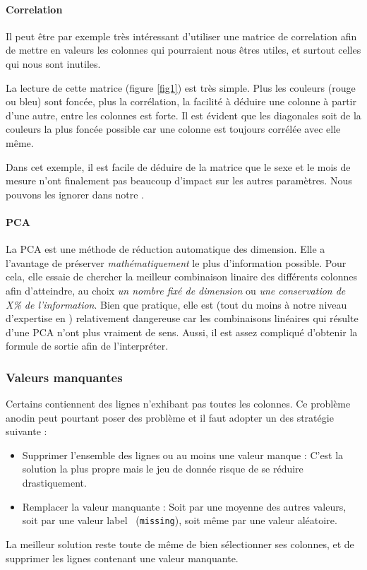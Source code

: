 \paragraph{Correlation}
Il peut être par exemple très intéressant d'utiliser une matrice de correlation afin de mettre en valeurs les colonnes qui pourraient nous êtres utiles, et surtout celles qui nous sont inutiles.

La lecture de cette matrice (figure \ref{fig1}) est très simple. Plus les couleurs (rouge ou bleu) sont foncée, plus la corrélation, \ie la facilité à déduire une colonne à partir d'une autre, entre les colonnes est forte. Il est évident que les diagonales soit de la couleurs la plus foncée possible car une colonne est toujours corrélée avec elle même.

Dans cet exemple, il est facile de déduire de la matrice que le sexe et le mois de mesure n'ont finalement pas beaucoup d'impact sur les autres paramètres. Nous pouvons les ignorer dans notre .

\paragraph{PCA}
La \gls{PCA} est une méthode de réduction automatique des dimension. Elle a l'avantage de préserver \textsl{mathématiquement} le plus d'information possible. Pour cela, elle essaie de chercher la meilleur combinaison linaire des différents colonnes afin d'atteindre, au choix \emph{un nombre fixé de dimension} ou \emph{une conservation de X\% de l'information}.
Bien que pratique, elle est (tout du moins à notre niveau d'expertise en ) relativement dangereuse car les combinaisons linéaires qui résulte d'une \gls{PCA} n'ont plus vraiment de sens. Aussi, il est assez compliqué d'obtenir la formule de sortie afin de l'interpréter.

\subsubsection{Valeurs manquantes}
Certains  contiennent des lignes n'exhibant pas toutes les colonnes. Ce problème anodin peut pourtant poser des problème et il faut adopter un des stratégie suivante :
\begin{itemize}
	\item Supprimer l'ensemble des lignes ou au moins une valeur manque : C'est la solution la plus propre mais le jeu de donnée risque de se réduire drastiquement.
	\item Remplacer la valeur manquante : Soit par une moyenne des autres valeurs, soit par une valeur \og label\fg~ (\eg \texttt{missing}), soit même par une valeur aléatoire.
\end{itemize}
La meilleur solution reste toute de même de bien sélectionner ses colonnes, et de supprimer les lignes contenant une valeur manquante.

